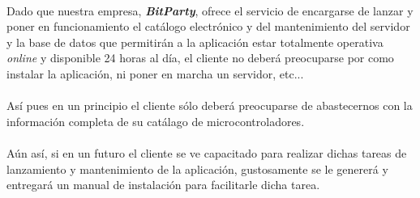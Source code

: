 \paragraph{}Dado que nuestra empresa, \textit{\textbf{BitParty}}, ofrece el servicio de encargarse de lanzar y poner en funcionamiento el catálogo electrónico y del mantenimiento del servidor y la base de datos que permitirán a la aplicación estar totalmente operativa \textit{online} y disponible 24 horas al día, el cliente no deberá preocuparse por como instalar la aplicación, ni poner en marcha un servidor, etc...

\paragraph{}Así pues en un principio el cliente sólo deberá preocuparse de abastecernos con la información completa de su catálago de microcontroladores.

\paragraph{}Aún así, si en un futuro el cliente se ve capacitado para realizar dichas tareas de lanzamiento y  mantenimiento de la aplicación, gustosamente se le genererá y entregará un manual de instalación para facilitarle dicha tarea.